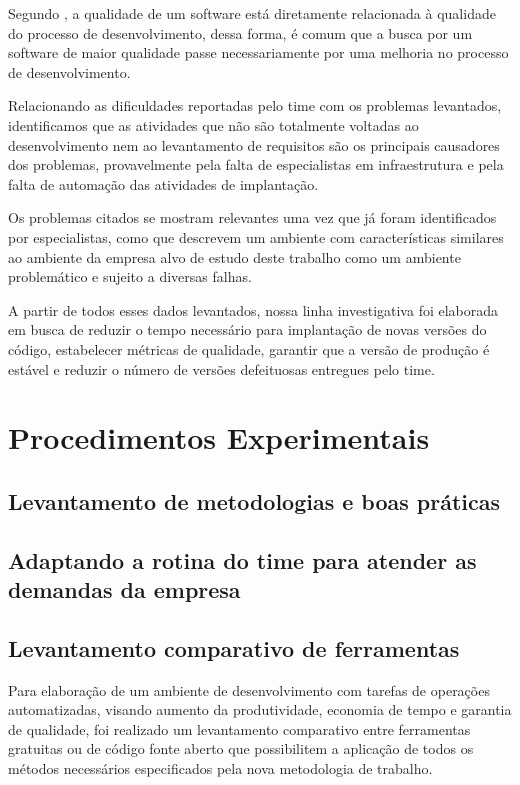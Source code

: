\documentclass[
	12pt,				%
	openright,			%
	twoside,			%
	a4paper,			%
	english,			%
	french,				%
	spanish,			%
	brazil,				%
	]{abntex2}
\begin{document}
Segundo , a qualidade de um software está diretamente relacionada à qualidade do processo de desenvolvimento, dessa forma, é comum que a busca por um software de maior qualidade passe necessariamente por uma melhoria no processo de desenvolvimento.

Relacionando as dificuldades reportadas pelo time com os problemas levantados, identificamos que as atividades que não são totalmente voltadas ao desenvolvimento nem ao levantamento de requisitos são os principais causadores dos problemas, provavelmente pela falta de especialistas em infraestrutura e pela falta de automação das atividades de implantação.

Os problemas citados se mostram relevantes uma vez que já foram identificados por especialistas, como  que descrevem um ambiente com características similares ao ambiente da empresa alvo de estudo deste trabalho como um ambiente problemático e sujeito a diversas falhas.

A partir de todos esses dados levantados, nossa linha investigativa foi elaborada em busca de reduzir o tempo necessário para implantação de novas versões do código, estabelecer métricas de qualidade, garantir que a versão de produção é estável e reduzir o número de versões defeituosas entregues pelo time.

\chapter{Procedimentos Experimentais}

\section{Levantamento de metodologias e boas práticas}

\section{Adaptando a rotina do time para atender as demandas da empresa}

\section{Levantamento comparativo de ferramentas}

Para elaboração de um ambiente de desenvolvimento com tarefas de operações automatizadas, visando aumento da produtividade, economia de tempo e garantia de qualidade, foi realizado um levantamento comparativo entre ferramentas gratuitas ou de código fonte aberto que possibilitem a aplicação de todos os métodos necessários especificados pela nova metodologia de trabalho.
\end{document}
